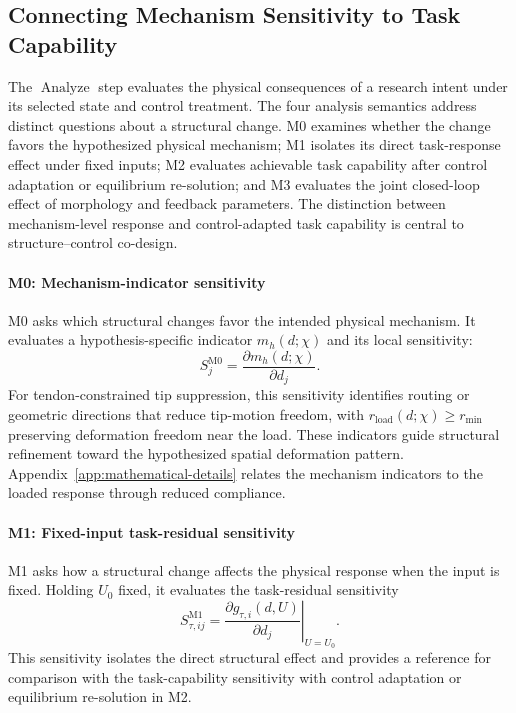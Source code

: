 \subsection{Connecting Mechanism Sensitivity to Task Capability}
\label{subsec:mathematical-research}
The $\operatorname{Analyze}$ step evaluates the physical consequences of a research intent under its selected state and control treatment. The four analysis semantics address distinct questions about a structural change. M0 examines whether the change favors the hypothesized physical mechanism; M1 isolates its direct task-response effect under fixed inputs; M2 evaluates achievable task capability after control adaptation or equilibrium re-solution; and M3 evaluates the joint closed-loop effect of morphology and feedback parameters. The distinction between mechanism-level response and control-adapted task capability is central to structure--control co-design.

\paragraph{M0: Mechanism-indicator sensitivity}
M0 asks which structural changes favor the intended physical mechanism. It evaluates a hypothesis-specific indicator $m_h(d;\chi)$ and its local sensitivity:
\begin{equation}
S_j^{\mathrm{M0}}=\frac{\partial m_h(d;\chi)}{\partial d_j}.
\label{eq:m0-sensitivity}
\end{equation}
For tendon-constrained tip suppression, this sensitivity identifies routing or geometric directions that reduce tip-motion freedom, with $r_{\mathrm{load}}(d;\chi)\geq r_{\min}$ preserving deformation freedom near the load. These indicators guide structural refinement toward the hypothesized spatial deformation pattern. Appendix~\ref{app:mathematical-details} relates the mechanism indicators to the loaded response through reduced compliance.

\paragraph{M1: Fixed-input task-residual sensitivity}
M1 asks how a structural change affects the physical response when the input is fixed. Holding $U_0$ fixed, it evaluates the task-residual sensitivity
\begin{equation}
S^{\mathrm{M1}}_{\tau,ij}=\left.\frac{\partial g_{\tau,i}(d,U)}{\partial d_j}\right|_{U=U_0}.
\label{eq:m1}
\end{equation}
This sensitivity isolates the direct structural effect and provides a reference for comparison with the task-capability sensitivity with control adaptation or equilibrium re-solution in M2.

